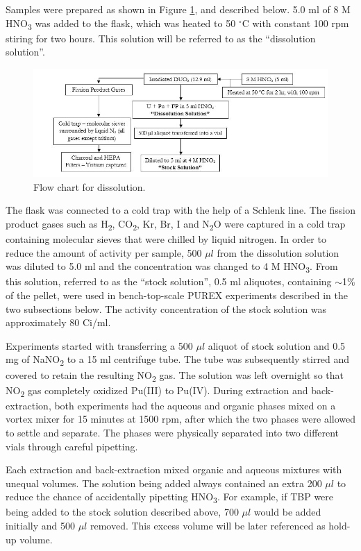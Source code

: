 \documentclass[review]{elsarticle}
\newcommand{\tsbs}{\textsubscript}
\begin{document}
Samples were prepared as shown in Figure \ref{fig:diss}, and described below. 5.0 ml of 8 M HNO\tsbs{3} was added to the flask, which was heated to 50 $^{\circ}$C
 with constant 100 rpm stiring for two hours. This solution will be referred to as the 
 ``dissolution solution''.
			\begin{figure}[h!]
				\centerline{\includegraphics[scale=0.65]{dissolution}}
				\caption{Flow chart for dissolution.}
				\label{fig:diss}
			\end{figure}
 The flask was connected to a cold trap with the help of a Schlenk 
 line. The fission product gases such as H\tsbs{2}, CO\tsbs{2}, Kr, Br, I and N\tsbs{2}O
 were captured in a cold trap containing molecular sieves that were chilled by liquid nitrogen.
 In order to reduce the amount of activity per sample, 500 $\mu l$ from the dissolution solution
 was diluted to 5.0 ml and the concentration was changed to 4 M HNO\tsbs{3}. From this solution, 
 referred to as the ``stock solution'', 0.5 ml aliquotes, containing $\sim$1\% of the pellet, were
 used in bench-top-scale PUREX experiments described in the two subsections below.
 The activity concentration of the stock solution was approximately 80 \mu Ci/ml.
 
Experiments started with transferring a 500 $\mu l$ aliquot of stock solution 
and 0.5 mg of NaNO\tsbs{2} to a 15 ml centrifuge tube. The tube was subsequently stirred and covered to retain the resulting NO\tsbs{2} gas.
The solution was left overnight so that NO\tsbs{2} gas completely oxidized Pu(III) to Pu(IV).
During extraction and back-extraction, both experiments had the aqueous and organic phases
mixed on a vortex mixer for 15 minutes at 1500 rpm, after which the two phases were allowed to settle and separate.
The phases were physically separated into two different vials through careful pipetting. 

Each extraction and back-extraction mixed organic and aqueous mixtures with unequal volumes. 
The solution being added always contained an extra 200 $\mu l$ to reduce the chance of accidentally
pipetting HNO\tsbs{3}. For example, if TBP were being added to the stock solution described above,
700 $\mu l$ would be added initially and 500 $\mu l$ removed. This excess volume will be later referenced
as hold-up volume. 
 
\end{document}
